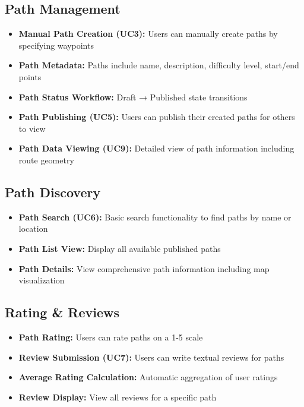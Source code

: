 \subsection{Path Management}
\label{subsec:impl_path_mgmt}

\begin{itemize}
    \item \textbf{Manual Path Creation (UC3):} Users can manually create paths by specifying waypoints
    \item \textbf{Path Metadata:} Paths include name, description, difficulty level, start/end points
    \item \textbf{Path Status Workflow:} Draft → Published state transitions
    \item \textbf{Path Publishing (UC5):} Users can publish their created paths for others to view
    \item \textbf{Path Data Viewing (UC9):} Detailed view of path information including route geometry
\end{itemize}

\subsection{Path Discovery}
\label{subsec:impl_path_discovery}

\begin{itemize}
    \item \textbf{Path Search (UC6):} Basic search functionality to find paths by name or location
    \item \textbf{Path List View:} Display all available published paths
    \item \textbf{Path Details:} View comprehensive path information including map visualization
\end{itemize}

\subsection{Rating \& Reviews}
\label{subsec:impl_ratings}

\begin{itemize}
    \item \textbf{Path Rating:} Users can rate paths on a 1-5 scale
    \item \textbf{Review Submission (UC7):} Users can write textual reviews for paths
    \item \textbf{Average Rating Calculation:} Automatic aggregation of user ratings
    \item \textbf{Review Display:} View all reviews for a specific path
\end{itemize}

